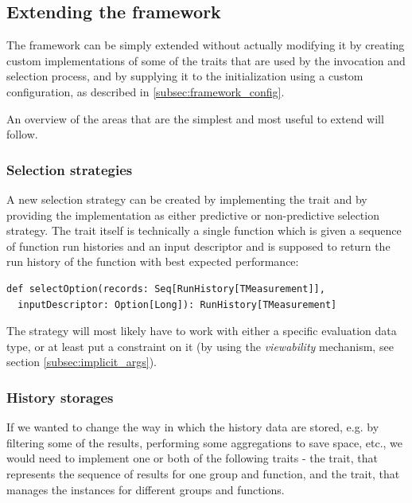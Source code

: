 \subsection{Extending the framework}

The framework can be simply extended without actually modifying it by creating custom implementations of some of the traits that are used by the invocation and selection process, and by supplying it to the  initialization using a custom configuration, as described in \ref{subsec:framework_config}.

An overview of the areas that are the simplest and most useful to extend will follow.

\subsubsection{Selection strategies}

A new selection strategy can be created by implementing the  trait and by providing the implementation as either predictive or non-predictive selection strategy. The trait itself is technically a single function which is given a sequence of function run histories and an input descriptor and is supposed to return the run history of the function with best expected performance:

\lstset{style=Scala}
\begin{lstlisting}
def selectOption(records: Seq[RunHistory[TMeasurement]], 
  inputDescriptor: Option[Long]): RunHistory[TMeasurement]
\end{lstlisting}

The strategy will most likely have to work with either a specific evaluation data type, or at least put a constraint on it (by using the \textit{viewability} mechanism, see section \ref{subsec:implicit_args}).

\subsubsection{History storages}

If we wanted to change the way in which the history data are stored, e.g. by filtering some of the results, performing some aggregations to save space, etc., we would need to implement one or both of the following traits - the  trait, that represents the sequence of results for one group and function, and the  trait, that manages the  instances for different groups and functions.

